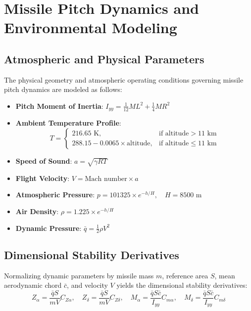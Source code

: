\documentclass[11pt, a4paper]{article}
\begin{document}
\section{Missile Pitch Dynamics and Environmental Modeling}

\subsection{Atmospheric and Physical Parameters}
The physical geometry and atmospheric operating conditions governing missile pitch dynamics are modeled as follows:
\begin{itemize}
    \item \textbf{Pitch Moment of Inertia}: $I_{yy} = \frac{1}{12} M L^2 + \frac{1}{4} M R^2$
    \item \textbf{Ambient Temperature Profile}: 
    \begin{equation}
    T = \begin{cases} 
    216.65 \text{ K}, & \text{if } \text{altitude} > 11 \text{ km} \\
    288.15 - 0.0065 \times \text{altitude}, & \text{if } \text{altitude} \le 11 \text{ km}
    \end{cases}
    \end{equation}
    \item \textbf{Speed of Sound}: $a = \sqrt{\gamma R T}$
    \item \textbf{Flight Velocity}: $V = \text{Mach number} \times a$
    \item \textbf{Atmospheric Pressure}: $p = 101325 \times e^{-h / H}, \quad H = 8500 \text{ m}$
    \item \textbf{Air Density}: $\rho = 1.225 \times e^{-h / H}$
    \item \textbf{Dynamic Pressure}: $\bar{q} = \frac{1}{2} \rho V^2$
\end{itemize}

\subsection{Dimensional Stability Derivatives}
Normalizing dynamic parameters by missile mass $m$, reference area $S$, mean aerodynamic chord $\bar{c}$, and velocity $V$ yields the dimensional stability derivatives:
\begin{equation}
Z_\alpha = \frac{\bar{q} S}{m V} C_{Z\alpha}, \quad Z_\delta = \frac{\bar{q} S}{m V} C_{Z\delta}, \quad M_\alpha = \frac{\bar{q} S \bar{c}}{I_{yy}} C_{m\alpha}, \quad M_\delta = \frac{\bar{q} S \bar{c}}{I_{yy}} C_{m\delta}
\end{equation}
\end{document}
